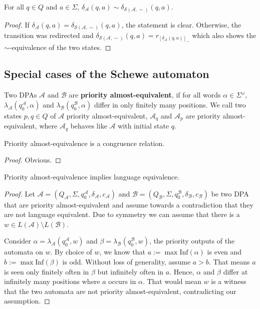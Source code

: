 \begin{lem}
\label{lem:schewe:sim_a_s}
	For all $q \in Q$ and $a \in \Sigma$, $\delta_\mathcal{A}(q, a) \sim \delta_{\mathcal{S}(\mathcal{A}, \sim)}(q, a)$.
\end{lem}

\begin{proof}
	If $\delta_\mathcal{A}(q, a) = \delta_{\mathcal{S}(\mathcal{A}, \sim)}(q, a)$, the statement is clear. Otherwise, the transition was redirected and $\delta_{\mathcal{S}(\mathcal{A}, \sim)}(q, a) = r_{[\delta_\mathcal{A}(q, a)]_\sim}$ which also shows the $\sim$-equivalence of the two states.
\end{proof}


\newpage


\subsection{Special cases of the Schewe automaton}
\begin{defn}
	Two DPAs $\mathcal{A}$ and $\mathcal{B}$ are \textbf{priority almost-equivalent}, if for all words $\alpha \in \Sigma^\omega$, $\lambda_\mathcal{A}(q_0^\mathcal{A}, \alpha)$ and $\lambda_\mathcal{B}(q_0^\mathcal{B}, \alpha)$ differ in only finitely many positions.
	We call two states $p, q \in Q$ of $\mathcal{A}$ priority almost-equivalent, $\mathcal{A}_q$ and $\mathcal{A}_p$ are priority almost-equivalent, where $\mathcal{A}_q$ behaves like $\mathcal{A}$ with initial state $q$.
\end{defn}

\begin{lem}
	Priority almost-equivalence is a congruence relation.
\end{lem}

\begin{proof}
	Obvious.
\end{proof}


\begin{lem}
	Priority almost-equivalence implies language equivalence.
\end{lem}

\begin{proof}
	Let $\mathcal{A} = (Q_\mathcal{A}, \Sigma, q_0^\mathcal{A}, \delta_\mathcal{A}, c_\mathcal{A})$ and $\mathcal{B} = (Q_\mathcal{B}, \Sigma, q_0^\mathcal{B}, \delta_\mathcal{B}, c_\mathcal{B})$ be two DPA that are priority almost-equivalent and assume towards a contradiction that they are not language equivalent. Due to symmetry we can assume that there is a $w \in L(\mathcal{A}) \setminus L(\mathcal{B})$. 
	
	Consider $\alpha = \lambda_\mathcal{A}(q_0^\mathcal{A}, w)$ and $\beta = \lambda_\mathcal{B}(q_0^\mathcal{B}, w)$, the priority outputs of the automata on $w$. By choice of $w$, we know that $a := \max \text{Inf}(\alpha)$ is even and $b := \max \text{Inf}(\beta)$ is odd. Without loss of generality, assume $a > b$. That means $a$ is seen only finitely often in $\beta$ but infinitely often in $a$. Hence, $\alpha$ and $\beta$ differ at infinitely many positions where $a$ occurs in $\alpha$. That would mean $w$ is a witness that the two automata are not priority almost-equivalent, contradicting our assumption.
\end{proof}


